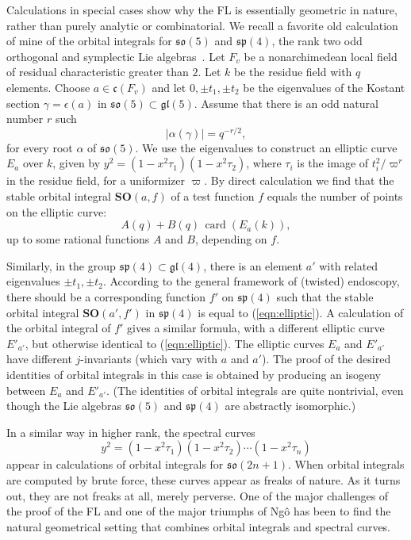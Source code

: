 \documentclass[brochure,english,12pt]{bourbaki}
\theoremstyle{plain}
\def\op#1{{\operatorname{#1}}}
\def\card{\op{card}}
\def\SO{{\mathbf {SO}}}
\def\so{\mathfrak{so}}
\def\sp{\mathfrak{sp}}
\def\gl{\mathfrak{gl}}
\def\cc{\mathfrak{c}}
\begin{document}
Calculations in special cases show why the FL is essentially geometric
in nature, rather than purely analytic or combinatorial. We recall a
favorite old calculation of mine of the orbital integrals for $\so(5)$
and $\sp(4)$, the rank two odd orthogonal and symplectic Lie
algebras~\cite{hyperelliptic-curves}.  Let $F_v$ be a nonarchimedean
local field of residual characteristic greater than $2$.  Let $k$ be
the residue field with $q$ elements.  Choose $a\in \cc(F_v)$  and let $0,\pm t_1,\pm t_2$ be
the eigenvalues of the Kostant section $\gamma=\epsilon(a)$ in $\so(5)\subset \gl(5)$.
Assume that there is an odd
natural number $r$ such
\[
|\alpha(\gamma)| = q^{-r/2},
\]
for every root $\alpha$ of $\so(5)$.  We use the eigenvalues to
construct an elliptic curve $E_a$ over $k$, given by $y^2 =
(1-x^2\tau_1)(1-x^2\tau_2)$, where $\tau_i$ is the image of
$t_i^2/\varpi^r$ in the residue field, for a uniformizer $\varpi$.  By
direct calculation we find that the stable orbital integral
$\SO(a,f)$ of a test function $f$ equals the number of points on the
elliptic curve:
\begin{equation}\label{eqn:elliptic}
A(q) + B(q)\, \card( E_a(k)),
\end{equation}
up to some rational functions $A$ and $B$, depending on $f$.

Similarly, in the group $\sp(4)\subset\gl(4)$, there is an element
${{a'}}$ with related eigenvalues $\pm t_1,\pm t_2$.  According to the
general framework of (twisted) endoscopy, there should be a
corresponding function $f'$ on $\sp(4)$ such that the stable orbital
integral $\SO(a',f')$ in $\sp(4)$ is equal to (\ref{eqn:elliptic}).  A
calculation of the orbital integral of $f'$ gives a similar formula,
with a different elliptic curve $E'_{{a'}}$, but otherwise identical
to (\ref{eqn:elliptic}).  The elliptic curves $E_a$ and $E'_{{a'}}$
have different $j$-invariants (which vary with $a$ and ${{a'}}$).  The
proof of the desired identities of orbital integrals in this case is
obtained by producing an isogeny between $E_a$ and $E'_{{a'}}$.  (The
 identities of orbital
integrals are quite nontrivial, even though the Lie algebras $\so(5)$
and $\sp(4)$ are abstractly isomorphic.)

In a similar way in higher rank,  the spectral curves
\[
y^2 = (1-x^2 \tau_1)(1-x^2 \tau_2)\cdots (1-x^2 \tau_n)
\]
appear  in calculations of orbital integrals for
$\so(2n+1)$.  When orbital integrals are computed by brute force,
these curves appear as freaks of nature.  As it turns
out, they are not freaks at all, merely perverse.  One of the major
challenges of the proof of the FL and one of the major
triumphs of Ng\^o has been to find the natural geometrical setting that combines
orbital integrals and spectral curves.
\end{document}
